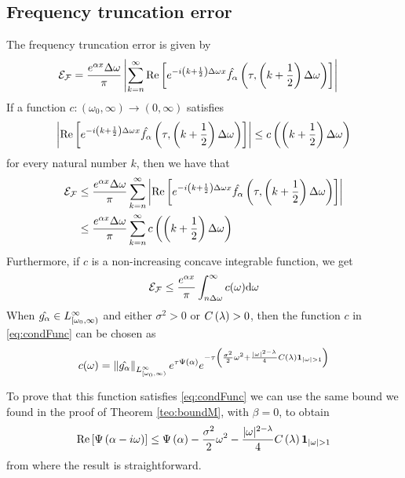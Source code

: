 \documentclass[11pt]{amsart}
\begin{document}
\subsection{Frequency truncation error}
The frequency truncation error is given by
\begin{align*}
\mathcal{E_F} &= \frac{e^{\alpha x}\Delta\omega}{\pi} \left| {\sum_{k=n}^{\infty} \mathrm{Re}\left[e^{-i{\left( {k+\frac12} \right)\Delta\omega} x} \hat{f_{\alpha}}\left( {\tau,{\left( {k+\frac12} \right)\Delta\omega}} \right)\right]} \right|
\end{align*}
If a function $c\colon (\omega_0,\infty) \to (0,\infty)$ satisfies
\begin{equation} \label{eq:condFunc}
\left| {\mathrm{Re}\left[e^{-i{\left( {k+\frac12} \right)\Delta\omega} x} \hat{f_{\alpha}}\left( {\tau,{\left( {k+\frac12} \right)\Delta\omega}} \right)\right]} \right| \leq c\left( {\left( {k+\frac12} \right)\Delta\omega} \right)
\end{equation}
for every natural number $k$, then we have that 
\begin{align*}
\mathcal{E_F} &\leq \frac{e^{\alpha x}\Delta\omega}{\pi} \sum_{k=n}^{\infty}\left| {\mathrm{Re}\left[e^{-i{\left( {k+\frac12} \right)\Delta\omega} x} \hat{f_{\alpha}}\left( {\tau,{\left( {k+\frac12} \right)\Delta\omega}} \right)\right]} \right| \\
& \leq \frac{e^{\alpha x}\Delta\omega}{\pi} \sum_{k=n}^{\infty} c\left( {\left( {k+\frac12} \right)\Delta\omega} \right)
\end{align*}
Furthermore, if $c$ is a non-increasing concave integrable function, we get 
\begin{equation}
\mathcal{E_F} \leq \frac{e^{\alpha x}}{\pi} \int_{n\Delta\omega}^{\infty} c(\omega) \textrm{d}\omega
\label{eq:truncationErrorIntegral}
\end{equation} 
When $\hat{g_{\alpha}}\in L^\infty_{[\omega_0,\infty)}$ and either $\sigma^2>0$ or $C \left( {\lambda} \right)>0$, then the function $c$ in \eqref{eq:condFunc} can be chosen as
\begin{equation} \label{eq:cutoffparticularSimpler}
c(\omega)=\norminf{\ft{\ga}}{[\omega_0,\infty)}\expfs{\tau \charExp{\damp}}\expfs{-\tau \parent{\frac{\sigma^2}{2} \omega^2 +\frac{|\omega|^{2 - \lambda}}{4} \cl\indicator_{\absval{\omega}>1} }}
\end{equation}

To prove that this function satisfies \eqref{eq:condFunc} we can use the same bound we found in the proof of Theorem \ref{teo:boundM}, with $\beta=0$, to obtain
\begin{equation*}
\real{\charExp{ \damp - i \omega}}\leq  \charExp{\damp} - \frac{\sigma^2}{2}\omega^2  - \frac{|\omega|^{2 - \lambda}}{4} \cl \indicator_{\absval{\omega}>1}
\end{equation*}
from where the result is straightforward.
\end{document}
